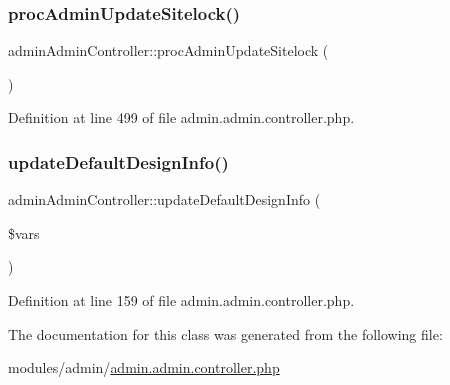 \subsubsection{\texorpdfstring{proc\+Admin\+Update\+Sitelock()}{procAdminUpdateSitelock()}}
{\footnotesize\ttfamily admin\+Admin\+Controller\+::proc\+Admin\+Update\+Sitelock (\begin{DoxyParamCaption}{ }\end{DoxyParamCaption})}



Definition at line 499 of file admin.\+admin.\+controller.\+php.

\mbox{\label{classadminAdminController_ab0f984cd55d52455a818323404efb974}} 
\subsubsection{\texorpdfstring{update\+Default\+Design\+Info()}{updateDefaultDesignInfo()}}
{\footnotesize\ttfamily admin\+Admin\+Controller\+::update\+Default\+Design\+Info (\begin{DoxyParamCaption}\item[{}]{\$vars }\end{DoxyParamCaption})}



Definition at line 159 of file admin.\+admin.\+controller.\+php.



The documentation for this class was generated from the following file\+:\begin{DoxyCompactItemize}
\item 
modules/admin/\hyperlink{admin_8admin_8controller_8php}{admin.\+admin.\+controller.\+php}\end{DoxyCompactItemize}
